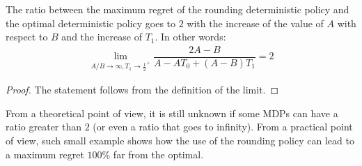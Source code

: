 \begin{lemma}\label{lemma:gap2}
The ratio between the maximum regret of the rounding deterministic policy and the optimal deterministic policy goes to $2$ with the increase of the value of $A$ with respect to $B$ and the increase of $T_1$. In other words:  
\begin{align*}
\lim_{A/B \rightarrow \infty, T_1 \rightarrow {\frac{1}{2}}^+} \dfrac{2A-B}{A- A T_0 +(A-B) T_1} = 2
\end{align*}
\end{lemma}
\begin{proof}
The statement follows from the definition of the limit.
\end{proof}


From a theoretical point of view, it is still unknown if some MDPs can have a ratio greater than $2$ (or even a ratio that goes to infinity). From a practical point of view, such small example shows how the use of the rounding policy can lead to a maximum regret  $100\%$ far from the optimal. 